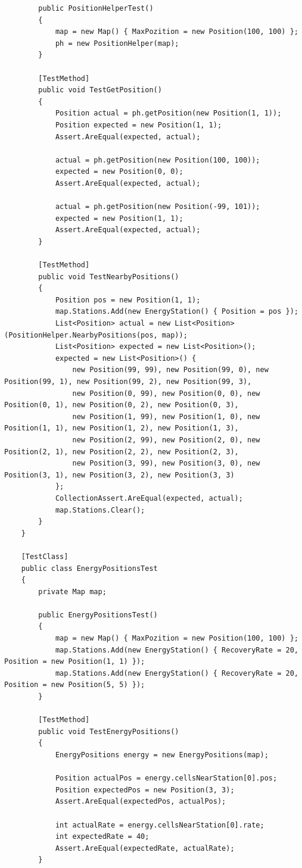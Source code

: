 \documentclass[14pt]{extreport}
\begin{document}
\begin{normalsize}
\begin{small}
\begin{lstlisting}
		public PositionHelperTest()
		{
			map = new Map() { MaxPozition = new Position(100, 100) };
			ph = new PositionHelper(map);
		}
		
		[TestMethod]
		public void TestGetPosition()
		{
			Position actual = ph.getPosition(new Position(1, 1));
			Position expected = new Position(1, 1);
			Assert.AreEqual(expected, actual);
			
			actual = ph.getPosition(new Position(100, 100));
			expected = new Position(0, 0);
			Assert.AreEqual(expected, actual);
			
			actual = ph.getPosition(new Position(-99, 101));
			expected = new Position(1, 1);
			Assert.AreEqual(expected, actual);
		}
		
		[TestMethod]
		public void TestNearbyPositions()
		{
			Position pos = new Position(1, 1);
			map.Stations.Add(new EnergyStation() { Position = pos });
			List<Position> actual = new List<Position>(PositionHelper.NearbyPositions(pos, map));
			List<Position> expected = new List<Position>();
			expected = new List<Position>() {
				new Position(99, 99), new Position(99, 0), new Position(99, 1), new Position(99, 2), new Position(99, 3),
				new Position(0, 99), new Position(0, 0), new Position(0, 1), new Position(0, 2), new Position(0, 3),
				new Position(1, 99), new Position(1, 0), new Position(1, 1), new Position(1, 2), new Position(1, 3),
				new Position(2, 99), new Position(2, 0), new Position(2, 1), new Position(2, 2), new Position(2, 3),
				new Position(3, 99), new Position(3, 0), new Position(3, 1), new Position(3, 2), new Position(3, 3)
			};
			CollectionAssert.AreEqual(expected, actual);
			map.Stations.Clear();
		}
	}
	
	[TestClass]
	public class EnergyPositionsTest
	{
		private Map map;
		
		public EnergyPositionsTest()
		{
			map = new Map() { MaxPozition = new Position(100, 100) };
			map.Stations.Add(new EnergyStation() { RecoveryRate = 20, Position = new Position(1, 1) });
			map.Stations.Add(new EnergyStation() { RecoveryRate = 20, Position = new Position(5, 5) });
		}
		
		[TestMethod]
		public void TestEnergyPositions()
		{
			EnergyPositions energy = new EnergyPositions(map);
			
			Position actualPos = energy.cellsNearStation[0].pos;
			Position expectedPos = new Position(3, 3);
			Assert.AreEqual(expectedPos, actualPos);
			
			int actualRate = energy.cellsNearStation[0].rate;
			int expectedRate = 40;
			Assert.AreEqual(expectedRate, actualRate);
		}
		

\end{lstlisting}
\end{small}
\end{normalsize}
\end{document}
